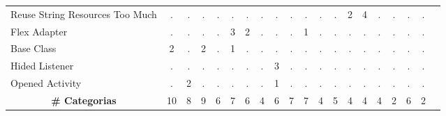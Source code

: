 \begin{table*}[t]
\begin{tabular}{p{4cm}|p{.3cm}p{.3cm}p{.3cm}p{.3cm}p{.3cm}p{.3cm}p{.3cm}p{.3cm}p{.3cm}p{.4cm}p{.4cm}p{.4cm}p{.4cm}p{.4cm}p{.4cm}p{.4cm}p{.4cm}p{.4cm}p{.4cm}}
Reuse String Resources Too Much						& \multicolumn{1}{c}{.}	& \multicolumn{1}{c}{.}	& \multicolumn{1}{c}{.}	& \multicolumn{1}{c}{.}	& \multicolumn{1}{c}{.}	& \multicolumn{1}{c}{.}	& \multicolumn{1}{c}{.}	& \multicolumn{1}{c}{.}	& \multicolumn{1}{c}{.}	& \multicolumn{1}{c}{.}	& \multicolumn{1}{c}{.}	& \multicolumn{1}{c}{.}	& \multicolumn{1}{c}{2}	& \multicolumn{1}{c}{4}	& \multicolumn{1}{c}{.}	& \multicolumn{1}{c}{.}	& \multicolumn{1}{c}{.}	& \multicolumn{1}{c}{.} 		 \\
Flex Adapter										& \multicolumn{1}{c}{.}	& \multicolumn{1}{c}{.}	& \multicolumn{1}{c}{.}	& \multicolumn{1}{c}{.}	& \multicolumn{1}{c}{3}	& \multicolumn{1}{c}{2}	& \multicolumn{1}{c}{.}	& \multicolumn{1}{c}{.}	& \multicolumn{1}{c}{.}	& \multicolumn{1}{c}{1}	& \multicolumn{1}{c}{.}	& \multicolumn{1}{c}{.}	& \multicolumn{1}{c}{.}	& \multicolumn{1}{c}{.}	& \multicolumn{1}{c}{.}	& \multicolumn{1}{c}{.}	& \multicolumn{1}{c}{.}	& \multicolumn{1}{c}{.} 		 \\
Base Class											& \multicolumn{1}{c}{2}	& \multicolumn{1}{c}{.}	& \multicolumn{1}{c}{2}	& \multicolumn{1}{c}{.}	& \multicolumn{1}{c}{1}	& \multicolumn{1}{c}{.}	& \multicolumn{1}{c}{.}	& \multicolumn{1}{c}{.}	& \multicolumn{1}{c}{.}	& \multicolumn{1}{c}{.}	& \multicolumn{1}{c}{.}	& \multicolumn{1}{c}{.}	& \multicolumn{1}{c}{.}	& \multicolumn{1}{c}{.}	& \multicolumn{1}{c}{.}	& \multicolumn{1}{c}{.}	& \multicolumn{1}{c}{.}	& \multicolumn{1}{c}{.} 		 \\
Hided Listener										& \multicolumn{1}{c}{.}	& \multicolumn{1}{c}{.}	& \multicolumn{1}{c}{.}	& \multicolumn{1}{c}{.}	& \multicolumn{1}{c}{.}	& \multicolumn{1}{c}{.}	& \multicolumn{1}{c}{.}	& \multicolumn{1}{c}{3}	& \multicolumn{1}{c}{.}	& \multicolumn{1}{c}{.}	& \multicolumn{1}{c}{.}	& \multicolumn{1}{c}{.}	& \multicolumn{1}{c}{.}	& \multicolumn{1}{c}{.}	& \multicolumn{1}{c}{.}	& \multicolumn{1}{c}{.}	& \multicolumn{1}{c}{.}	& \multicolumn{1}{c}{.} 		 \\
Opened Activity										& \multicolumn{1}{c}{.}	& \multicolumn{1}{c}{2}	& \multicolumn{1}{c}{.}	& \multicolumn{1}{c}{.}	& \multicolumn{1}{c}{.}	& \multicolumn{1}{c}{.}	& \multicolumn{1}{c}{.}	& \multicolumn{1}{c}{1}	& \multicolumn{1}{c}{.}	& \multicolumn{1}{c}{.}	& \multicolumn{1}{c}{.}	& \multicolumn{1}{c}{.}	& \multicolumn{1}{c}{.}	& \multicolumn{1}{c}{.}	& \multicolumn{1}{c}{.}	& \multicolumn{1}{c}{.}	& \multicolumn{1}{c}{.}	& \multicolumn{1}{c}{.} 		 \\
\hline
\multicolumn{1}{c}{\textbf{\# Categorias}}	& \multicolumn{1}{c}{10} & \multicolumn{1}{c}{8} & \multicolumn{1}{c}{9} & \multicolumn{1}{c}{6} & \multicolumn{1}{c}{7} & \multicolumn{1}{c}{6} & \multicolumn{1}{c}{4} & \multicolumn{1}{c}{6} & \multicolumn{1}{c}{7} & \multicolumn{1}{c}{7} & \multicolumn{1}{c}{4} & \multicolumn{1}{c}{5} & \multicolumn{1}{c}{4} & \multicolumn{1}{c}{4} & \multicolumn{1}{c}{4} & \multicolumn{1}{c}{2} & \multicolumn{1}{c}{6} & \multicolumn{1}{c}{2} \\

\end{tabular}
\end{table*}
